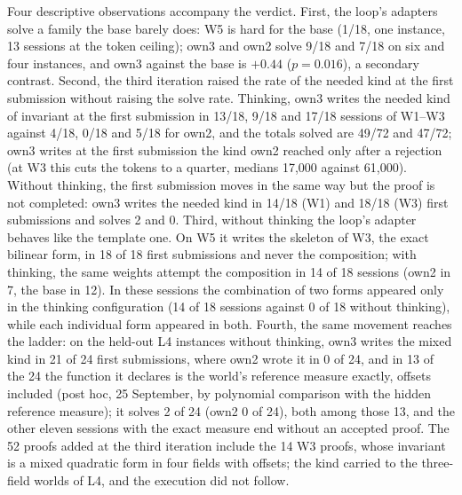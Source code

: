 \documentclass[11pt]{article}
\begin{document}
\begin{table}[!htbp]
\centering\footnotesize
\setlength{\tabcolsep}{3pt}
\resizebox{\textwidth}{!}{}
\caption{The third iteration, all blocks complete (594 sessions, none lost). Own3 and own2 are compared on identical cells; the ladder comparator is own2's run of 16 September on the same cells. Registered primary: own3 $-$ own2 on W5 with thinking; own3 $-$ base on W5 is secondary.}
\label{tab:a9}
\end{table}

Four descriptive observations accompany the verdict. First, the loop's
adapters solve a family the base barely does: W5 is hard for the base
(1/18, one instance, 13 sessions at the token ceiling); own3 and own2 solve
9/18 and 7/18 on six and four instances, and own3 against the base is
$+0.44$ ($p=0.016$), a secondary contrast. Second, the third iteration
raised the rate of the needed kind at the first submission without
raising the solve rate. Thinking, own3 writes the needed kind of invariant
at the first submission in 13/18, 9/18 and 17/18 sessions of W1--W3
against 4/18, 0/18 and 5/18 for own2, and the totals solved are 49/72 and
47/72; own3 writes at the first submission the kind own2 reached only after a rejection (at W3 this cuts
the tokens to a quarter, medians 17,000 against 61,000). Without thinking, the first submission moves in the same way but the proof is not completed: own3 writes the needed
kind in 14/18 (W1) and 18/18 (W3) first submissions and solves 2 and 0.
Third, without thinking the loop's adapter behaves like the template one.
On W5 it writes the skeleton of W3, the exact bilinear form, in 18 of 18
first submissions and never the composition; with thinking, the same
weights attempt the composition in 14 of 18 sessions (own2 in 7, the base
in 12). In these sessions the combination of two forms appeared only in
the thinking configuration (14 of 18 sessions against 0 of 18 without
thinking), while each individual form appeared in both. Fourth, the same movement reaches the ladder: on the held-out L4 instances without thinking, own3 writes the mixed kind in 21 of 24 first submissions, where own2 wrote it in 0 of 24, and in 13 of the 24 the function it declares is the world's reference measure exactly, offsets included (post hoc, 25 September, by polynomial comparison with the hidden reference measure); it solves 2 of 24 (own2 0 of 24), both among those 13, and the other eleven sessions with the exact measure end without an accepted proof. The 52 proofs added at the third iteration include the 14 W3 proofs, whose invariant is a mixed quadratic form in four fields with offsets; the kind carried to the three-field worlds of L4, and the execution did not follow.
\end{document}
